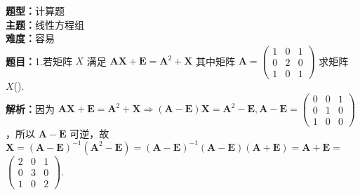 \documentclass{ctexart}
\newenvironment{question}[5]{%
	\noindent\textbf{题型：}#1\\
	\textbf{主题：}#2\\
	\textbf{难度：}#3\\
	\textbf{题目：}#4\\
	\textbf{解析：}#5\\
	\vspace{1em}
}{}
\begin{document}
	\begin{question}
		{计算题}
		{线性方程组}
		{容易}
		{1.若矩阵 \(X\) 满足 \(\mathbf{A X}+\mathbf{E}=\mathbf{A}^2+\mathbf{X}\) 其中矩阵 \(\mathbf{A}=\left(\begin{array}{ccc}1 & 0 & 1 \\ 0 & 2 & 0 \\ 1 & 0 & 1\end{array}\right)\) 求矩阵 \(X\)(\qquad).}
		{因为 \(\mathbf{A X}+\mathbf{E}=\mathbf{A}^2+\mathbf{X} \Rightarrow(\mathbf{A}-\mathbf{E}) \mathbf{X}=\mathbf{A}^2-\mathbf{E}, \mathbf{A}-\mathbf{E}=\left(\begin{array}{lll}0 & 0 & 1 \\ 0 & 1 & 0 \\ 1 & 0 & 0\end{array}\right)\) ，所以 \(\mathbf{A}-\mathbf{E}\) 可逆，故 \(\mathbf{X}=(\mathbf{A}-\mathbf{E})^{-1}\left(\mathbf{A}^2-\mathbf{E}\right)=(\mathbf{A}-\mathbf{E})^{-1}(\mathbf{A}-\mathbf{E})(\mathbf{A}+\mathbf{E})=\mathbf{A}+\mathbf{E}=\) \(\left(\begin{array}{lll}2 & 0 & 1 \\ 0 & 3 & 0 \\ 1 & 0 & 2\end{array}\right)\).}
	\end{question}
	
\end{document}
